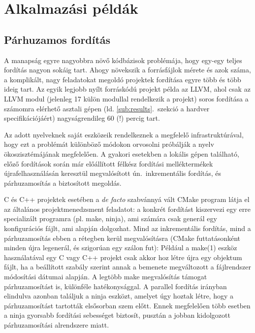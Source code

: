 \chapter{Alkalmazási példák}

\section{Párhuzamos fordítás}

A manapság egyre nagyobbra növő kódbázisok problémája, hogy egy-egy teljes fordítás nagyon sokáig tart.
Ahogy növekszik a forrásfájlok mérete és azok száma, a komplikált, nagy feladatokat megoldó projektek fordítása egyre több és több ideig tart.
Az egyik legjobb nyílt forráskódú projekt példa az LLVM, ahol csak az LLVM modul (jelenleg 17 külön modullal rendelkezik a projekt) soros fordítása a számomra elérhető asztali gépen (ld. \ref{sub:results}.\ szekció a hardver specifikációjáért) nagyságrendileg 60 (!) percig tart.

Az adott nyelveknek saját eszközeik rendelkeznek a megfelelő infrastruktúrával, hogy ezt a problémát különböző módokon orvosolni próbálják a nyelv ökoszisztémájának megfelelően.
A gyakori esetekben a lokális gépen található, előző fordítások során már előállított félkész fordítási melléktermékek újrafelhasználásán keresztül megvalósított ún.\ inkrementális fordítás, és párhuzamosítás a biztosított megoldás.

C és C++ projektek esetében a \textit{de facto} szabvánnyá vált CMake program látja el az általános projektmenedzsment feladatot: a konkrét fordítást kiszervezi egy erre specializált programra (pl. make, ninja), ami számára csak generál egy konfigurációs fájlt, ami alapján dolgozhat.
Mind az inkrementális fordítás, mind a párhuzamosítás ebben a rétegben kerül megvalósításra (CMake futtatásonként minden újra legenerál, és szigorúan egy szálon fut):
Például a make(1) eszköz használatával egy C vagy C++ projekt csak akkor hoz létre újra egy objektum fájlt, ha a beállított szabály szerint annak a bemenete megváltozott a fájlrendszer módosítási dátumai alapján.
A legtöbb make megvalósítás támogat párhuzamosítást is, különféle hatékonysággal.
A parallel fordítás irányban elindulva azonban találjuk a ninja eszközt, amelyet úgy hoztak létre, hogy a párhuzamosítást tartották elsősorban szem előtt.
Ennek megfelelően több esetben a ninja gyorsabb fordítási sebességet biztosít, pusztán a jobban kidolgozott párhuzamosítási alrendszere miatt.

